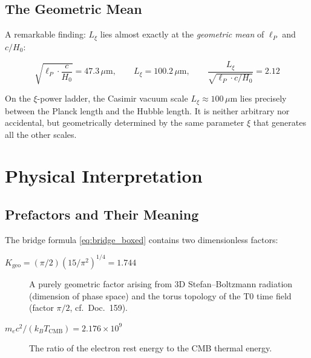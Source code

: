 \subsection{The Geometric Mean}

A remarkable finding: $L_\xi$ lies almost exactly at the
\emph{geometric mean} of $\ell_P$ and $c/H_0$:

\begin{equation}
    \sqrt{\ell_P \cdot \frac{c}{H_0}} = 47.3\,\mu\text{m},
    \qquad
    L_\xi = 100.2\,\mu\text{m},
    \qquad
    \frac{L_\xi}{\sqrt{\ell_P \cdot c/H_0}} = 2.12
    \label{eq:geom_mean}
\end{equation}

\begin{insightBox}
    On the $\xi$-power ladder, the Casimir vacuum scale $L_\xi \approx 100\,\mu\text{m}$
    lies precisely between the Planck length and the Hubble length.
    It is neither arbitrary nor accidental, but geometrically determined
    by the same parameter $\xi$ that generates all the other scales.
\end{insightBox}

\section{Physical Interpretation}
\label{sec:interpretation}

\subsection{Prefactors and Their Meaning}

The bridge formula \eqref{eq:bridge_boxed} contains two dimensionless factors:

\begin{description}
    \item[$K_\text{geo} = (\pi/2)(15/\pi^2)^{1/4} = 1.744$]
        A purely geometric factor arising from 3D Stefan--Boltzmann radiation
        (dimension of phase space) and the torus topology of the T0 time field
        (factor $\pi/2$, cf.\ Doc.~159).

    \item[$m_e c^2 / (k_B T_\text{CMB}) = 2.176 \times 10^9$]
        The ratio of the electron rest energy to the CMB thermal energy.
\end{description}

